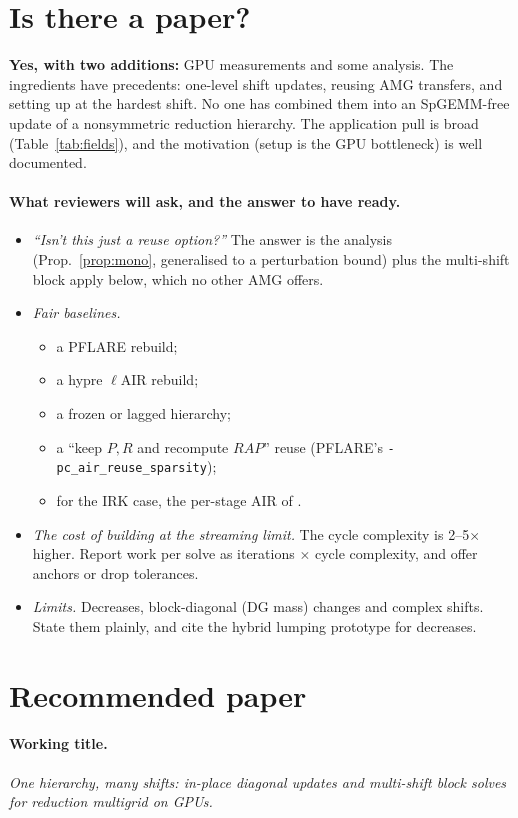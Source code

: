 \documentclass[11pt,a4paper]{article}
\begin{document}
\section{Is there a paper?}
\textbf{Yes, with two additions:} GPU measurements and some analysis. The ingredients have precedents: one-level shift updates, reusing AMG transfers, and setting up at the hardest shift. No one has combined them into an SpGEMM-free update of a nonsymmetric reduction hierarchy. The application pull is broad (Table~\ref{tab:fields}), and the motivation (setup is the GPU bottleneck) is well documented.

\paragraph{What reviewers will ask, and the answer to have ready.}
\begin{itemize}
\item \emph{``Isn't this just a reuse option?''} The answer is the analysis (Prop.~\ref{prop:mono}, generalised to a perturbation bound) plus the multi-shift block apply below, which no other AMG offers.
\item \emph{Fair baselines.}
  \begin{itemize}
  \item a PFLARE rebuild;
  \item a hypre $\ell$AIR rebuild;
  \item a frozen or lagged hierarchy;
  \item a ``keep $P,R$ and recompute $RAP$'' reuse (PFLARE's \texttt{-pc\_air\_reuse\_sparsity});
  \item for the IRK case, the per-stage AIR of \cite{SKPD22}.
  \end{itemize}
\item \emph{The cost of building at the streaming limit.} The cycle complexity is 2--5$\times$ higher. Report work per solve as iterations $\times$ cycle complexity, and offer anchors or drop tolerances.
\item \emph{Limits.} Decreases, block-diagonal (DG mass) changes and complex shifts. State them plainly, and cite the hybrid lumping prototype for decreases.
\end{itemize}

\section{Recommended paper}
\paragraph{Working title.} \emph{One hierarchy, many shifts: in-place diagonal updates and multi-shift block solves for reduction multigrid on GPUs.}
\end{document}
